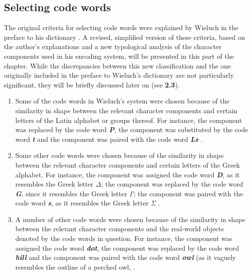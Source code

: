 \documentclass[output=paper,colorlinks,citecolor=brown,arabicfont,chinesefont]{langscibook}
\begin{document}
\subsection{Selecting code words}

The original criteria for selecting code words were explained by Wieluch in the preface to his dictionary \citep[4-9\textsubscript{p}]{Wieluch1936}. A revised, simplified version of these criteria, based on the author's explanations and a new typological analysis of the character components used in his encoding system, will be presented in this part of the chapter. While the discrepancies between this new classification and the one originally included in the preface to Wieluch's dictionary are not particularly significant, they will be briefly discussed later on (see \textbf{2.3}).

\begin{enumerate}
    \item Some of the code words in Wieluch's system were chosen because of the similarity in shape between the relevant character components and certain letters of the Latin alphabet or groups thereof. For instance, the component {} was replaced by the code word \textbf{\emph{P}}, the component {} was substituted by the code word \textbf{\emph{t}} and the component {} was paired with the code word \textbf{\emph{Ls}} \citep[4\textsubscript{p}, \emph{Tables I \& II}]{Wieluch1936}.
    \item Some other code words were chosen because of the similarity in shape between the relevant character components and certain letters of the Greek alphabet. For instance, the component {} was assigned the code word \textbf{\emph{D}}, as it resembles the Greek letter \emph{Δ}; the component {} was replaced by the code word \textbf{\emph{G}}, since it resembles the Greek letter \emph{Γ}; the component {} was paired with the code word \textbf{\emph{s}}, as it resembles the Greek letter \emph{Σ} \citep[4\textsubscript{p}, \emph{Tables I \& II}]{Wieluch1936}.
    \item A number of other code words were chosen because of the similarity in shape between the relevant character components and the real-world objects denoted by the code words in question. For instance, the component {} was assigned the code word \textbf{\emph{dot}}, the component {} was replaced by the code word \textbf{\emph{hill}} and the component {} was paired with the code word \textbf{\emph{owl}} (as it vaguely resembles the outline of a perched owl, \citep[4\textsubscript{p}, \emph{Tables I \& II}]{Wieluch1936}.

\end{enumerate}
\end{document}
